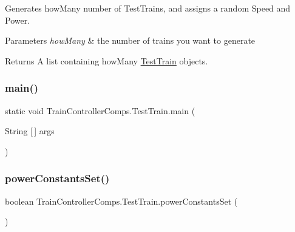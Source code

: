 Generates \textquotesingle{}how\+Many\textquotesingle{} number of Test\+Trains, and assigns a random Speed and Power. 


\begin{DoxyParams}{Parameters}
{\em how\+Many} & the number of trains you want to generate \\
\hline
\end{DoxyParams}
\begin{DoxyReturn}{Returns}
A list containing \textquotesingle{}how\+Many\textquotesingle{} \hyperlink{classTrainControllerComps_1_1TestTrain}{Test\+Train} objects. 
\end{DoxyReturn}
\mbox{\label{classTrainControllerComps_1_1TestTrain_abcd04903f3a72e1cc2c667edfc3930ec}} 
\subsubsection{\texorpdfstring{main()}{main()}}
{\footnotesize\ttfamily static void Train\+Controller\+Comps.\+Test\+Train.\+main (\begin{DoxyParamCaption}\item[{String \mbox{[}$\,$\mbox{]}}]{args }\end{DoxyParamCaption})\hspace{0.3cm}{\ttfamily [static]}}

\mbox{\label{classTrainControllerComps_1_1TestTrain_aeae0e0501dad3d4529679d01c7baca6b}} 
\subsubsection{\texorpdfstring{power\+Constants\+Set()}{powerConstantsSet()}}
{\footnotesize\ttfamily boolean Train\+Controller\+Comps.\+Test\+Train.\+power\+Constants\+Set (\begin{DoxyParamCaption}{ }\end{DoxyParamCaption})}



